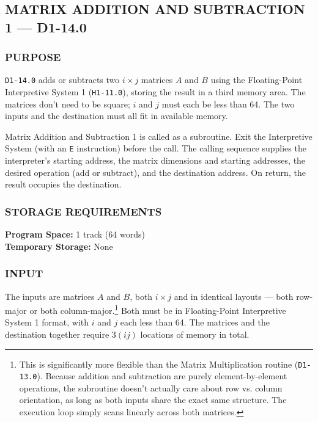 \subsection*{MATRIX ADDITION AND SUBTRACTION 1 --- D1-14.0}
\label{subsec:matrix_addition_subtraction_1}

\subsubsection*{PURPOSE}
\texttt{D1-14.0} adds or subtracts two $i \times j$ matrices $A$ and $B$ using the Floating-Point Interpretive System 1 (\texttt{H1-11.0}), storing the result in a third memory area. The matrices don't need to be square; $i$ and $j$ must each be less than 64. The two inputs and the destination must all fit in available memory.

Matrix Addition and Subtraction 1 is called as a subroutine. Exit the Interpretive System (with an \texttt{E} instruction) before the call. The calling sequence supplies the interpreter's starting address, the matrix dimensions and starting addresses, the desired operation (add or subtract), and the destination address. On return, the result occupies the destination.

\subsubsection*{STORAGE REQUIREMENTS}
\textbf{Program Space:} 1 track (64 words) \\
\textbf{Temporary Storage:} None

\subsubsection*{INPUT}
The inputs are matrices $A$ and $B$, both $i \times j$ and in identical layouts --- both row-major or both column-major.\footnote{This is significantly more flexible than the Matrix Multiplication routine (\texttt{D1-13.0}). Because addition and subtraction are purely element-by-element operations, the subroutine doesn't actually care about row vs. column orientation, as long as both inputs share the exact same structure. The execution loop simply scans linearly across both matrices.} Both must be in Floating-Point Interpretive System 1 format, with $i$ and $j$ each less than 64. The matrices and the destination together require $3(ij)$ locations of memory in total.

